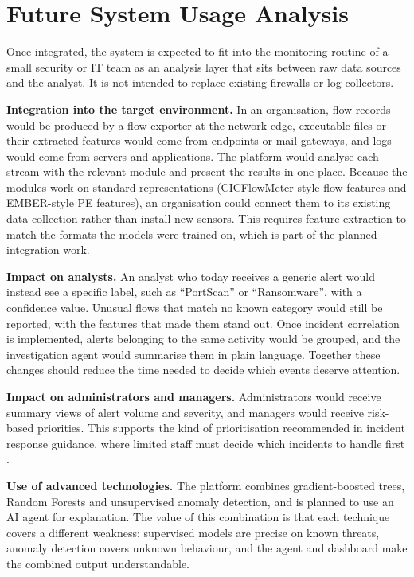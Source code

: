 \section{Future System Usage Analysis}

Once integrated, the system is expected to fit into the monitoring routine of a small security or IT team as an analysis layer that sits between raw data sources and the analyst. It is not intended to replace existing firewalls or log collectors.

\textbf{Integration into the target environment.} In an organisation, flow records would be produced by a flow exporter at the network edge, executable files or their extracted features would come from endpoints or mail gateways, and logs would come from servers and applications. The platform would analyse each stream with the relevant module and present the results in one place. Because the modules work on standard representations (CICFlowMeter-style flow features and EMBER-style PE features), an organisation could connect them to its existing data collection rather than install new sensors. This requires feature extraction to match the formats the models were trained on, which is part of the planned integration work.

\textbf{Impact on analysts.} An analyst who today receives a generic alert would instead see a specific label, such as ``PortScan'' or ``Ransomware'', with a confidence value. Unusual flows that match no known category would still be reported, with the features that made them stand out. Once incident correlation is implemented, alerts belonging to the same activity would be grouped, and the investigation agent would summarise them in plain language. Together these changes should reduce the time needed to decide which events deserve attention.

\textbf{Impact on administrators and managers.} Administrators would receive summary views of alert volume and severity, and managers would receive risk-based priorities. This supports the kind of prioritisation recommended in incident response guidance, where limited staff must decide which incidents to handle first \cite{nist80061r3}.

\textbf{Use of advanced technologies.} The platform combines gradient-boosted trees, Random Forests and unsupervised anomaly detection, and is planned to use an AI agent for explanation. The value of this combination is that each technique covers a different weakness: supervised models are precise on known threats, anomaly detection covers unknown behaviour, and the agent and dashboard make the combined output understandable.

